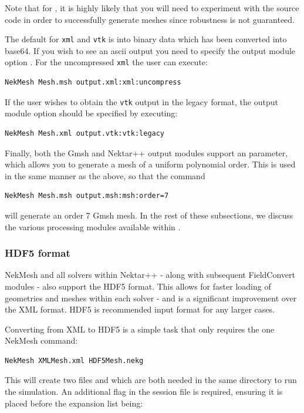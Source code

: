 Note that for \gmsh, it is highly likely that you will
need to experiment with the source code in order to successfully generate
meshes since robustness is not guaranteed.

The default for \texttt{xml} and \texttt{vtk} is into binary data which has been
converted into base64. If you wish to see an ascii output you need to
specify the output module option . For the uncompressed 
\texttt{xml} the user can execute:
%
\begin{lstlisting}[style=BashInputStyle]
NekMesh Mesh.msh output.xml:xml:uncompress
\end{lstlisting}
%
If the user wishes to obtain the \texttt{vtk} output in the legacy format,
the output module option  should be specified by executing:
%
\begin{lstlisting}[style=BashInputStyle]
NekMesh Mesh.xml output.vtk:vtk:legacy
\end{lstlisting}
%
Finally, both the Gmsh and Nektar++ output modules support an 
parameter, which allows you to generate a mesh of a uniform polynomial
order. This is used in the same manner as the above, so that the command
%
\begin{lstlisting}[style=BashInputStyle]
NekMesh Mesh.msh output.msh:msh:order=7
\end{lstlisting}
%
will generate an order 7 Gmsh mesh. In the rest of these subsections, we discuss
the various processing modules available within \nm.

\subsubsection{HDF5 format}

NekMesh and all solvers within Nektar++ - along with subsequent FieldConvert modules - also support the HDF5 format. This allows for faster loading of geometries and meshes within each solver - and is a significant improvement over the XML format. HDF5 is recommended input format for any larger cases.

Converting from XML to HDF5 is a simple task that only requires the one NekMesh command:
\begin{lstlisting}[style=BashInputStyle]
    NekMesh XMLMesh.xml HDF5Mesh.nekg
\end{lstlisting}

This will create two files  and  which are both needed in the same directory to run the simulation. An additional flag in the session file is required, ensuring it is placed before the expansion list being:

